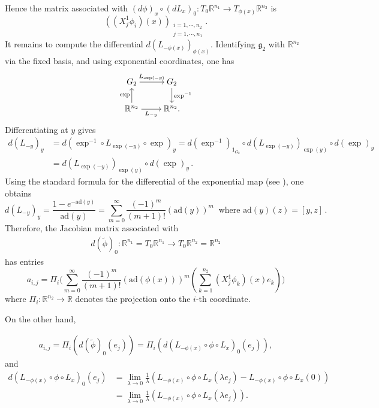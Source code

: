 \documentclass[dvipsnames]{amsart}
\theoremstyle{definition}
\theoremstyle{definition}
\numberwithin{equation}{section}
\begin{document}
 Hence the matrix associated with $(d\phi)_x \circ (dL_x)_0: T_0\mathbb{R}^{n_1} \rightarrow T_{\phi(x)}\mathbb{R}^{n_2}$ is  
\begin{equation*}
    \left( (X_j^1\phi_i)(x) \right)_{\substack{i=1,\cdots,n_2\\ j = 1, \cdots,n_1}}.
\end{equation*} 
It remains to compute the differential $d(L_{-\phi(x)})_{\phi(x)}$.
Identifying $\mathfrak g_2$ with $\mathbb R^{n_2}$ via the fixed basis, and using exponential coordinates, one has
\[\begin{tikzcd}[ampersand replacement=\&,cramped]
	{G_2} \& {G_2} \\
	{\mathbb{R}^{n_2}} \& {\mathbb{R}^{n_2}.}
	\arrow["{L_{\exp(-y)}}", from=1-1, to=1-2]
	\arrow["{\exp^{-1}}", from=1-2, to=2-2]
	\arrow["\exp", from=2-1, to=1-1]
	\arrow["{L_{-y}}"', from=2-1, to=2-2]
\end{tikzcd}\]
Differentiating at $y$ gives
\begin{align*}
    d(L_{-y})_y &= d(\exp^{-1} \circ L_{\exp(-y)} \circ \exp)_y    = d(\exp^{-1})_{1_{G_2}} \circ d(L_{\exp(-y)})_{\exp(y)} \circ d(\exp)_y \\
    &= d(L_{\exp(-y)})_{\exp(y)} \circ d(\exp)_y\,.
\end{align*}
Using the standard formula for the differential of the exponential map (see \cite[Theorem 1.7, Chapter II]{Helgason2001}), one obtains
\begin{equation*}
    d(L_{-y})_y = \frac{1 - e^{-\text{ad}(y)}}{\text{ad}(y)} = \sum_{m=0}^{\infty}\frac{(-1)^m}{(m+1)!}(\text{ad}(y))^m\ \text{ where }\text{ad}(y)(z) = [y,z]\,.
\end{equation*}
 Therefore, the Jacobian matrix associated with
 \begin{align*}
     d(\widetilde{\phi})_0: \mathbb{R}^{n_1} = T_0\mathbb{R}^{n_1} \rightarrow T_0\mathbb{R}^{n_2} = \mathbb{R}^{n_2}
 \end{align*}
 has entries
\begin{equation}\label{formula esplicita differenziale classico}
    a_{i,j} = \Pi_{i} \Big ( \sum_{m=0}^{\infty}\frac{(-1)^m}{(m+1)!}(\text{ad}(\phi(x)))^m ( \sum_{k=1}^{n_2} (X_j^1\phi_k)(x) e_k )\Big)
\end{equation}
where $\Pi_i : \mathbb{R}^{n_2}  \to \mathbb{R}$ denotes the projection onto the 
$i$-th coordinate.

On the other hand, 

\begin{align*}
    a_{i,j} = \Pi_i(d(\widetilde{\phi})_0(e_j)) = \Pi_i(d(L_{-\phi(x)} \circ \phi \circ L_x)_0(e_j)),
\end{align*}
and
\begin{align*}
    d(L_{-\phi(x)} \circ \phi \circ L_x)_0(e_j) &= \lim_{\lambda\rightarrow 0} \frac{1}{\lambda} \left ( L_{-\phi(x)} \circ \phi \circ L_x(\lambda e_j) - L_{-\phi(x)} \circ \phi \circ L_x (0)  \right)\\ 
    &=  \lim_{\lambda\rightarrow 0} \frac{1}{\lambda} \left ( L_{-\phi(x)} \circ \phi \circ L_x(\lambda e_j) \right).
\end{align*}
\end{document}

